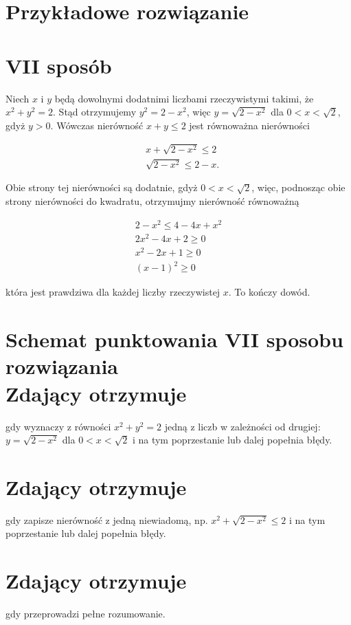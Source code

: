 \documentclass[10pt]{article}
\begin{document}
\section*{Przykładowe rozwiązanie}
\section*{VII sposób}
Niech $x$ i $y$ będą dowolnymi dodatnimi liczbami rzeczywistymi takimi, że $x^{2}+y^{2}=2$. Stąd otrzymujemy $y^{2}=2-x^{2}$, więc $y=\sqrt{2-x^{2}}$ dla $0<x<\sqrt{2}$, gdyż $y>0$. Wówczas nierówność $x+y \leq 2$ jest równoważna nierówności

$$
\begin{aligned}
& x+\sqrt{2-x^{2}} \leq 2 \\
& \sqrt{2-x^{2}} \leq 2-x .
\end{aligned}
$$

Obie strony tej nierówności są dodatnie, gdyż $0<x<\sqrt{2}$, więc, podnosząc obie strony nierówności do kwadratu, otrzymujmy nierówność równoważną

$$
\begin{gathered}
2-x^{2} \leq 4-4 x+x^{2} \\
2 x^{2}-4 x+2 \geq 0 \\
x^{2}-2 x+1 \geq 0 \\
(x-1)^{2} \geq 0
\end{gathered}
$$

która jest prawdziwa dla każdej liczby rzeczywistej $x$. To kończy dowód.

\section*{Schemat punktowania VII sposobu rozwiązania \\
 Zdający otrzymuje}
gdy wyznaczy z równości $x^{2}+y^{2}=2$ jedną z liczb w zależności od drugiej: $y=\sqrt{2-x^{2}}$ dla $0<x<\sqrt{2}$ i na tym poprzestanie lub dalej popełnia błędy.

\section*{Zdający otrzymuje}
gdy zapisze nierówność z jedną niewiadomą, np. $x^{2}+\sqrt{2-x^{2}} \leq 2$ i na tym poprzestanie lub dalej popełnia błędy.

\section*{Zdający otrzymuje}
gdy przeprowadzi pełne rozumowanie.
\end{document}
